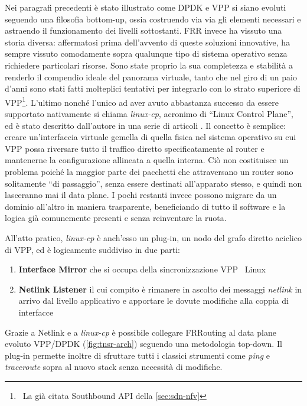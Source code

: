 Nei paragrafi precedenti è stato illustrato come DPDK e VPP si siano evoluti seguendo una filosofia bottom-up, ossia costruendo via via gli elementi necessari e astraendo il funzionamento dei livelli sottostanti. FRR invece ha vissuto una storia diversa: affermatosi prima dell'avvento di queste soluzioni innovative, ha sempre vissuto comodamente sopra qualunque tipo di sistema operativo senza richiedere particolari risorse. Sono state proprio la sua completezza e stabilità a renderlo il compendio ideale del panorama virtuale, tanto che nel giro di un paio d'anni sono stati fatti molteplici tentativi per integrarlo con lo strato superiore di VPP\footnote{\ La già citata Southbound API della \cref{sec:sdn-nfv}}. L'ultimo nonché l'unico ad aver avuto abbastanza successo da essere supportato nativamente si chiama \textit{linux-cp}, acronimo di ``Linux Control Plane'', ed è stato descritto dall'autore in una serie di articoli \cite{pim-linux-cp}. Il concetto è semplice: creare un'interfaccia virtuale gemella di quella fisica nel sistema operativo su cui VPP possa riversare tutto il traffico diretto specificatamente al router e mantenerne la configurazione allineata a quella interna. Ciò non costituisce un problema poiché la maggior parte dei pacchetti che attraversano un router sono solitamente ``di passaggio'', senza essere destinati all'apparato stesso, e quindi non lasceranno mai il data plane. I pochi restanti invece possono migrare da un dominio all'altro in maniera trasparente, beneficiando di tutto il software e la logica già comunemente presenti e senza reinventare la ruota.

All'atto pratico, \textit{linux-cp} è anch'esso un plug-in, un nodo del grafo diretto aciclico di VPP, ed è logicamente suddiviso in due parti:

\begin{enumerate}
    \item \textbf{Interface Mirror} che si occupa della sincronizzazione VPP \textrightarrow\ Linux
    \item \textbf{Netlink Listener} il cui compito è rimanere in ascolto dei messaggi \textit{netlink} in arrivo dal livello applicativo e apportare le dovute modifiche alla coppia di interfacce
\end{enumerate}

Grazie a Netlink e a \textit{linux-cp} è possibile collegare FRRouting al data plane evoluto VPP/DPDK (\cref{fig:tnsr-arch}) seguendo una metodologia top-down. Il plug-in permette inoltre di sfruttare tutti i classici strumenti come \textit{ping} e \textit{traceroute} sopra al nuovo stack senza necessità di modifiche.

